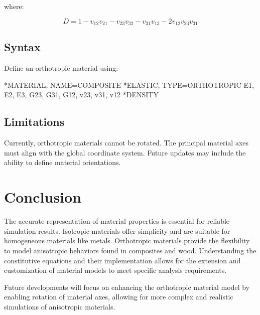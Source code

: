 where:

\[
D = 1 - v_{12} v_{21} - v_{23} v_{32} - v_{31} v_{13} - 2 v_{12} v_{23} v_{31}
\]

\subsection{Syntax}

Define an orthotropic material using:

\begin{codeBlock}
*MATERIAL, NAME=COMPOSITE
*ELASTIC, TYPE=ORTHOTROPIC
E1, E2, E3, G23, G31, G12, v23, v31, v12
*DENSITY
\rho
\end{codeBlock}

\subsection{Limitations}

Currently, orthotropic materials cannot be rotated. The principal material axes must align with the global coordinate system. Future updates may include the ability to define material orientations.

\section{Conclusion}

The accurate representation of material properties is essential for reliable simulation results. Isotropic materials offer simplicity and are suitable for homogeneous materials like metals. Orthotropic materials provide the flexibility to model anisotropic behaviors found in composites and wood. Understanding the constitutive equations and their implementation allows for the extension and customization of material models to meet specific analysis requirements.

Future developments will focus on enhancing the orthotropic material model by enabling rotation of material axes, allowing for more complex and realistic simulations of anisotropic materials.
